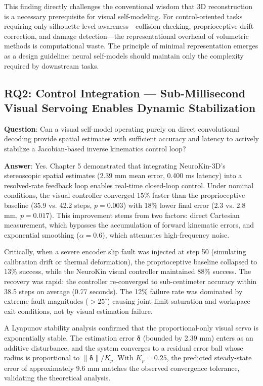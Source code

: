 ﻿\documentclass[12pt,a4paper,oneside]{report}
\begin{document}
This finding directly challenges the conventional wisdom that 3D reconstruction is a necessary prerequisite for visual self-modeling. For control-oriented tasks requiring only silhouette-level awareness---collision checking, proprioceptive drift correction, and damage detection---the representational overhead of volumetric methods is computational waste. The principle of minimal representation emerges as a design guideline: neural self-models should maintain only the complexity required by downstream tasks.

\subsection{RQ2: Control Integration --- Sub-Millisecond Visual Servoing Enables Dynamic Stabilization}

\textbf{Question}: Can a visual self-model operating purely on direct convolutional decoding provide spatial estimates with sufficient accuracy and latency to actively stabilize a Jacobian-based inverse kinematics control loop?

\textbf{Answer}: Yes. Chapter 5 demonstrated that integrating NeuroKin-3D's stereoscopic spatial estimates (2.39 mm mean error, 0.400 ms latency) into a resolved-rate feedback loop enables real-time closed-loop control. Under nominal conditions, the visual controller converged 15\% faster than the proprioceptive baseline (35.9 vs. 42.2 steps, $p = 0.003$) with 18\% lower final error (2.3 vs. 2.8 mm, $p = 0.017$). This improvement stems from two factors: direct Cartesian measurement, which bypasses the accumulation of forward kinematic errors, and exponential smoothing ($\alpha = 0.6$), which attenuates high-frequency noise.

Critically, when a severe encoder slip fault was injected at step 50 (simulating calibration drift or thermal deformation), the proprioceptive baseline collapsed to 13\% success, while the NeuroKin visual controller maintained 88\% success. The recovery was rapid: the controller re-converged to sub-centimeter accuracy within 38.5 steps on average (0.77 seconds). The 12\% failure rate was dominated by extreme fault magnitudes ($>25^\circ$) causing joint limit saturation and workspace exit conditions, not by visual estimation failure.

A Lyapunov stability analysis confirmed that the proportional-only visual servo is exponentially stable. The estimation error $\boldsymbol{\delta}$ (bounded by 2.39 mm) enters as an additive disturbance, and the system converges to a residual error ball whose radius is proportional to $\|\boldsymbol{\delta}\|/K_p$. With $K_p = 0.25$, the predicted steady-state error of approximately 9.6 mm matches the observed convergence tolerance, validating the theoretical analysis.
\end{document}
